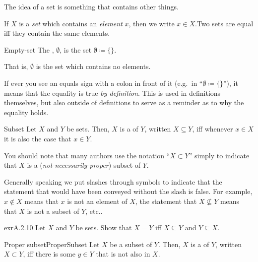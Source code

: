 The idea of a set is something that contains other things.
\begin{textequation}
If $X$ is a \emph{set} which contains an \emph{element} $x$, then we write $x\in X$.\footnotemark Two sets are equal iff they contain the same elements.
\end{textequation}
\begin{dfn}{Empty-set}{}
The , $\emptyset$\index[notation]{$\emptyset$}, is the set $\emptyset \coloneqq \{ \}$.
\begin{rmk}
That is, $\emptyset$ is the set which contains no elements.
\end{rmk}
\end{dfn}
\begin{rmk}
If ever you see an equals sign with a colon in front of it (e.g.~in ``$\emptyset \coloneqq \{ \}$''), it means that the equality is true \emph{by definition}.  This is used in definitions themselves, but also outside of definitions to serve as a reminder as to why the equality holds.\index[notation]{$\coloneqq $}
\end{rmk}
\begin{dfn}{Subset}{}
Let $X$ and $Y$ be sets.  Then, $X$ is a  of $Y$, written $X\subseteq Y$, iff whenever $x\in X$ it is also the case that $x\in Y$.
\begin{rmk}
You should note that many authors use the notation ``$X\subset Y$'' simply to indicate that $X$ is a (\emph{not-necessarily-proper}) subset of $Y$.
\end{rmk}
\end{dfn}
\begin{rmk}
Generally speaking we put slashes through symbols to indicate that the statement that would have been conveyed without the slash is false.  For example, $x\notin X$ means that $x$ is not an element of $X$, the statement that $X\not \subseteq Y$ means that $X$ is not a subset of $Y$, etc..
\end{rmk}
\begin{exr}{}{exrA.2.10}
Let $X$ and $Y$ be sets.  Show that $X=Y$ iff $X\subseteq Y$ and $Y\subseteq X$.
\end{exr}
\begin{dfn}{Proper subset}{ProperSubset}
Let $X$ be a subset of $Y$.  Then, $X$ is a  of $Y$, written $X\subset Y$, iff there is some $y\in Y$ that is not also in $X$.
\end{dfn}
